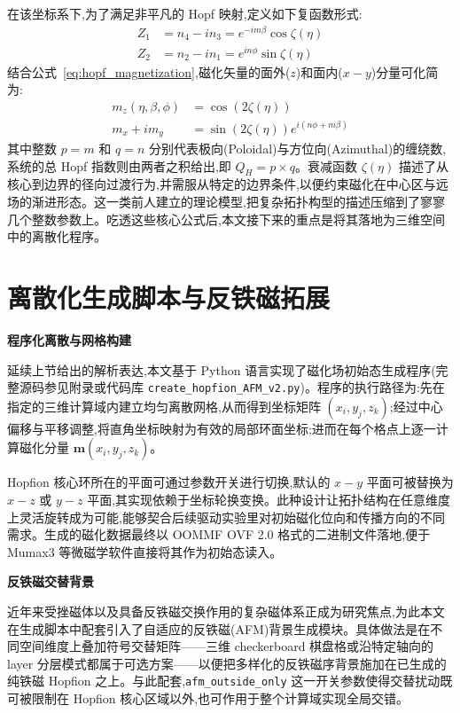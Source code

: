 在该坐标系下,为了满足非平凡的 Hopf 映射,定义如下复函数形式:
\begin{align}
    Z_1 &= n_4 - i n_3 = e^{-im\beta} \cos \zeta(\eta) \\
    Z_2 &= n_2 - i n_1 = e^{in\phi} \sin \zeta(\eta)
\end{align}
结合公式~\eqref{eq:hopf_magnetization},磁化矢量的面外($z$)和面内($x-y$)分量可化简为:
\begin{align}
    m_z(\eta, \beta, \phi) &= \cos(2\zeta(\eta)) \\
    m_x + i m_y &= \sin(2\zeta(\eta)) e^{i(n\phi + m\beta)}
\end{align}
其中整数 $p=m$ 和 $q=n$ 分别代表极向(Poloidal)与方位向(Azimuthal)的缠绕数,系统的总 Hopf 指数则由两者之积给出,即 $Q_H = p \times q$。衰减函数 $\zeta(\eta)$ 描述了从核心到边界的径向过渡行为,并需服从特定的边界条件,以便约束磁化在中心区与远场的渐进形态。这一类前人建立的理论模型,把复杂拓扑构型的描述压缩到了寥寥几个整数参数上。吃透这些核心公式后,本文接下来的重点是将其落地为三维空间中的离散化程序。

\section{离散化生成脚本与反铁磁拓展}

\par\noindent\textbf{程序化离散与网格构建}\par\nobreak
延续上节给出的解析表达,本文基于 Python 语言实现了磁化场初始态生成程序(完整源码参见附录或代码库 \texttt{create\_hopfion\_AFM\_v2.py})。程序的执行路径为:先在指定的三维计算域内建立均匀离散网格,从而得到坐标矩阵 $(x_i, y_j, z_k)$;经过中心偏移与平移调整,将直角坐标映射为有效的局部环面坐标;进而在每个格点上逐一计算磁化分量 $\mathbf{m}(x_i, y_j, z_k)$。

Hopfion 核心环所在的平面可通过参数开关进行切换,默认的 $x-y$ 平面可被替换为 $x-z$ 或 $y-z$ 平面,其实现依赖于坐标轮换变换。此种设计让拓扑结构在任意维度上灵活旋转成为可能,能够契合后续驱动实验里对初始磁化位向和传播方向的不同需求。生成的磁化数据最终以 OOMMF OVF 2.0 格式的二进制文件落地,便于 Mumax3 等微磁学软件直接将其作为初始态读入。

\par\noindent\textbf{反铁磁交替背景}\par\nobreak
近年来受挫磁体以及具备反铁磁交换作用的复杂磁体系正成为研究焦点,为此本文在生成脚本中配套引入了自适应的反铁磁(AFM)背景生成模块。具体做法是在不同空间维度上叠加符号交替矩阵——三维 checkerboard 棋盘格或沿特定轴向的 layer 分层模式都属于可选方案——以便把多样化的反铁磁序背景施加在已生成的纯铁磁 Hopfion 之上。与此配套,\texttt{afm\_outside\_only} 这一开关参数使得交替扰动既可被限制在 Hopfion 核心区域以外,也可作用于整个计算域实现全局交错。

